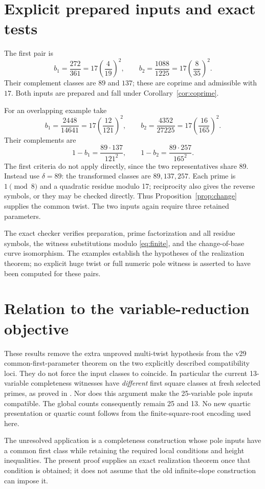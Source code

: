 \documentclass[11pt,a4paper]{article}
\theoremstyle{definition}\newtheorem{definition}[theorem]{Definition}
\theoremstyle{remark}\newtheorem{remark}[theorem]{Remark}
\begin{document}
\section{Explicit prepared inputs and exact tests}
The first pair is
\[
 b_1=\frac{272}{361}=17\left(\frac4{19}\right)^2,\qquad
 b_2=\frac{1088}{1225}=17\left(\frac8{35}\right)^2.
\]
Their complement classes are $89$ and $137$; these are coprime and
admissible with $17$. Both inputs are prepared and fall under
Corollary~\ref{cor:coprime}.

For an overlapping example take
\[
 b_1=\frac{2448}{14641}=17\left(\frac{12}{121}\right)^2,\qquad
 b_2=\frac{4352}{27225}=17\left(\frac{16}{165}\right)^2.
\]
Their complements are
\[
 1-b_1=\frac{89\cdot137}{121^2},\qquad
 1-b_2=\frac{89\cdot257}{165^2}.
\]
The first criteria do not apply directly, since the two representatives
share 89. Instead use $\delta=89$: the transformed classes are
$89,137,257$. Each prime is $1\pmod8$ and a quadratic residue modulo
17; reciprocity also gives the reverse symbols, or they may be checked
directly. Thus Proposition~\ref{prop:change} supplies the common twist.
The two inputs again require three retained parameters.

The exact checker verifies preparation, prime factorization and all
residue symbols, the witness substitutions modulo \eqref{eq:finite},
and the change-of-base curve isomorphism. The examples establish the
hypotheses of the realization theorem; no explicit huge twist or full
numeric pole witness is asserted to have been computed for these pairs.

\section{Relation to the variable-reduction objective}
These results remove the extra unproved multi-twist hypothesis from the
v29 common-first-parameter theorem on the two explicitly described
compatibility loci. They do not force the input classes to coincide.
In particular the current 13-variable completeness witnesses have
\emph{different} first square classes at fresh selected primes, as
proved in \cite{Fresh}. Nor does this argument make the 25-variable
pole inputs compatible. The global counts consequently remain 25 and
13. No new quartic presentation or quartic count follows from the
finite-square-root encoding used here.

The unresolved application is a completeness construction whose pole
inputs have a common first class while retaining the required local
conditions and height inequalities. The present proof supplies an exact
realization theorem once that condition is obtained; it does not assume
that the old infinite-slope construction can impose it.
\end{document}

